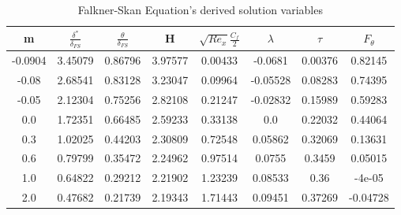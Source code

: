 \begin{table}
   \centering
    \caption{Falkner-Skan Equation's derived solution variables}
    \label{table_f}
    \begin{tabular}{|c|c|c|c|c|c|c|c|}
    \hline
        m & $\frac{\delta^*}{\delta_{FS}}$ & $\frac{\theta}{\delta_{FS}}$ & H & $\sqrt{Re_x}\frac{C_f}{2}$ & $\lambda$ & $\tau$ & $F_\theta$ \\ \hline
    -0.0904 & 3.45079 & 0.86796 & 3.97577 & 0.00433 & -0.0681 & 0.00376 & 0.82145 \\ \hline
    -0.08 & 2.68541 & 0.83128 & 3.23047 & 0.09964 & -0.05528 & 0.08283 & 0.74395 \\ \hline
    -0.05 & 2.12304 & 0.75256 & 2.82108 & 0.21247 & -0.02832 & 0.15989 & 0.59283 \\ \hline
    0.0 & 1.72351 & 0.66485 & 2.59233 & 0.33138 & 0.0 & 0.22032 & 0.44064 \\ \hline
    0.3 & 1.02025 & 0.44203 & 2.30809 & 0.72548 & 0.05862 & 0.32069 & 0.13631 \\ \hline
    0.6 & 0.79799 & 0.35472 & 2.24962 & 0.97514 & 0.0755 & 0.3459 & 0.05015 \\ \hline
    1.0 & 0.64822 & 0.29212 & 2.21902 & 1.23239 & 0.08533 & 0.36 & -4e-05 \\ \hline
    2.0 & 0.47682 & 0.21739 & 2.19343 & 1.71443 & 0.09451 & 0.37269 & -0.04728 \\ \hline
    \end{tabular}
\end{table}

